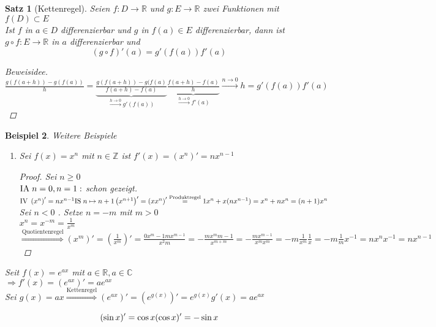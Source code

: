 \documentclass[a4paper,titlepage,oneside]{article}
\def\C{\ensuremath{\mathbb{C}} }
\def\Z{\ensuremath{\mathbb{Z}} }
\def\R{\ensuremath{\mathbb{R}} }
\def\im{\ensuremath{\mathit{i}} }
\def\e{\ensuremath{\mathit{e}} }
\newcommand{\IA}[1][n=0]{\vspace{0.1pt}\ensuremath{\text{IA}\sp#1:}}
\newcommand{\IV}{\vspace{0.1pt}\ensuremath{\text{IV}\sp}}
\newcommand{\IS}[1][n \mapsto n+1]{\vspace{0.1pt}\ensuremath{\text{IS}\sp#1}}
\def\sp{\hspace{0,1cm}}
\newcommand{\longtonull}[1][n]{\ensuremath{\overset{\scriptscriptstyle{#1 \to 0}}{\longrightarrow}}}
\theoremstyle{thmstyle}
\newtheorem{satz}{Satz}[subsection]
\newtheorem{bsp}[satz]{Beispiel}
\begin{document}
\begin{satz}[Kettenregel]
Seien $f: D \to \R$ und $g : E \to \R$ zwei Funktionen mit $f(D) \subset E$\\
Ist $f$ in $a \in D$ differenzierbar und $g$ in $f(a) \in E$ differenzierbar, dann ist $g \circ f : E \to \R $ in $a$ differenzierbar und \[ \left(g \circ f\right)'(a) = g'(f(a)) f'(a)\]
\begin{proof}[Beweisidee]
$\frac{g(f(a+h)) - g(f(a))}{h} = \underbrace{\frac{g(f(a+h)) - g(f(a)}{f(a+h)-f(a)}}_{\longtonull[h] g'(f(a))} \underbrace{\frac{f(a+h) - f(a)}{h}}_{\longtonull[h] f'(a)} \longtonull{h} = g'(f(a))f'(a)$
\end{proof}
\end{satz}

\begin{bsp} Weitere Beispiele
\begin{enumerate}
\item Sei $f(x) = x^n$ mit $n \in \Z$ ist $f'(x) = \left(x^n\right)' = n x^{n-1}$
\begin{proof} Sei $n \ge 0$ \\
$\IA[n=0, n=1] $ schon gezeigt.\\
$\IV \left(x^n\right)' = n x^{n-1}\\
\IS \\
\left(x^{n+1}\right)' = \left(x x^n\right)' \overset{\text{Produktregel}}{=} 1 x^n + x (n x^{n-1}) = x^n + n x^n = (n+1) x^n$\\
Sei $n < 0$ . Setze $n = -m$ mit $m > 0$\\
$x^n = x^{-m} = \frac{1}{x^m}$
$\overset{\text{Quotientenregel}}{\Rightarrow} \left(x^m\right)' = \left(\frac{1}{x^m}\right)' = \frac{0 x^m - 1 m x^{m-1}}{x^2m} = - \frac{m x^m{m-1}}{x^{m+m}} = - \frac{mx^{m-1}}{x^mx^m} = -m \frac{1}{x^m}\frac{1}{x} = - m \frac{1}{m} x^{-1} = n x^n x^{-1} = n x^{n-1}$
\end{proof}
\end{enumerate}
\item Seit $f(x) = \e^{ax}$ mit $a \in \R , a \in \C$\\
$\Rightarrow f'(x) = (\e^{ax})' = a \e^{ax}$\\
Sei $g(x) = ax \overset{\text{Kettenregel}}{\Rightarrow}  (\e^{ax})' =  (\e^{g(x)})' =  \e^{g(x)}g'(x) =  a \e^{ax}$
\item \[(\sin x)' = \cos x \\ (\cos x)' = - \sin x\]

\end{bsp}
\end{document}
